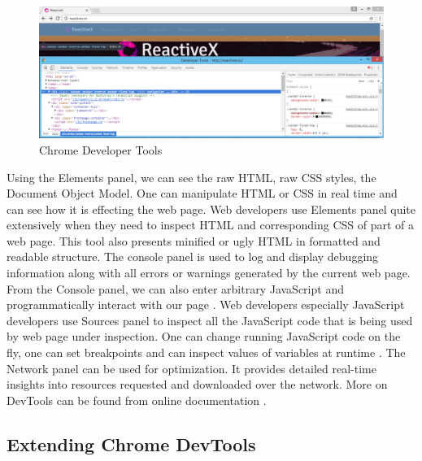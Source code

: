 \begin{figure}[!h]
	\centering
	\includegraphics[scale=0.5,trim=0 0 0 0]{gfx/dev_tools.png}
	\caption{Chrome Developer Tools}
	\label{fig:chrome_dev_tools}
	
\end{figure} 

Using the Elements panel, we can see the raw HTML, raw CSS styles, the Document Object Model. One can manipulate HTML or CSS in real time and can see how it is effecting the web page. Web developers use Elements panel quite extensively when they need to inspect HTML and corresponding CSS of part of a web page. This tool also presents minified or ugly HTML in formatted and readable structure. The console panel is used to log and display debugging information along with all errors or warnings generated by the current web page. From the Console panel, we can also enter arbitrary JavaScript and programmatically interact with our page \cite{CCDT}. Web developers especially JavaScript developers use Sources panel to inspect all the JavaScript code that is being used by web page under inspection. One can change running JavaScript code on the fly, one can set breakpoints and can inspect values of variables at runtime \cite{JSDebCDT}. The Network panel can be used for optimization. It provides detailed real-time insights into resources requested and downloaded over the network. More on DevTools can be found from online documentation \cite{CDT}.

\subsection{Extending Chrome DevTools} 	\label{subsec:Extending_Chrome_DevTools}

